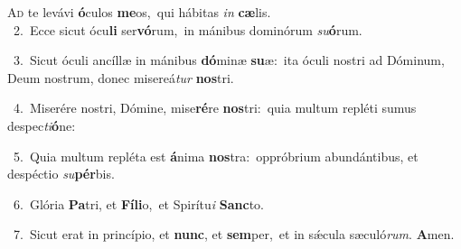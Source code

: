 \lettrine{\initial\textcolor{\initialcolor}{A}}{d} te levávi \textbf{ó}\-culos \textbf{me}\-os,~\star qui hábitas \textit{in} \textbf{cæ}\-lis.\\
{\numbfont\textcolor{\numbcolor}{~2.}}~Ecce sicut ócu\textbf{li} ser\-\textbf{vó}\-rum,~\star in mánibus dominórum \textit{su}\-\textbf{ó}rum.\par
{\numbfont\textcolor{\numbcolor}{~3.}}~Sicut óculi ancíllæ in mánibus \textbf{dó}\-minæ \textbf{su}\-æ:~\star ita óculi nostri ad Dóminum, Deum nostrum, donec misereá\textit{tur} \textbf{nos}\-tri.\par
{\numbfont\textcolor{\numbcolor}{~4.}}~Miserére nostri, Dómine, mise\-\textbf{ré}\-re \textbf{nos}\-tri:~\star quia multum repléti sumus despec\-\textit{ti}\-\textbf{ó}ne:\par
{\numbfont\textcolor{\numbcolor}{~5.}}~Quia multum repléta est \textbf{á}\-nima \textbf{nos}\-tra:~\star oppróbrium abundántibus, et despéctio \textit{su}\-\textbf{pér}bis.\par
{\numbfont\textcolor{\numbcolor}{~6.}}~Glória \textbf{Pa}\-tri, et \textbf{Fí}\-\textbf{li}o,~\star et Spirítu\textit{i} \textbf{Sanc}\-to.\par
{\numbfont\textcolor{\numbcolor}{~7.}}~Sicut erat in princípio, et \textbf{nunc}\-, et \textbf{sem}\-per,~\star et in sǽcula sæculó\-\textit{rum}\-. \textbf{A}\-men.\par

